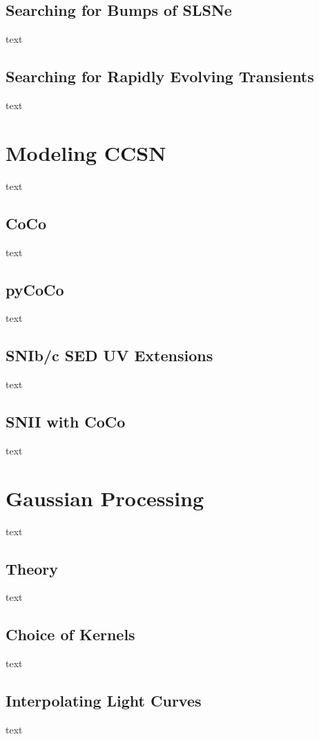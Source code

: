 \subsection{Searching for Bumps of SLSNe}
text
\subsection{Searching for Rapidly Evolving Transients}
text

\section{Modeling CCSN}
text
\subsection{CoCo}
text
\subsection{pyCoCo}
text
\subsection{SNIb/c SED UV Extensions}
text
\subsection{SNII with CoCo}
text

\section{Gaussian Processing}
text
\subsection{Theory}
text
\subsection{Choice of Kernels}
text
\subsection{Interpolating Light Curves}
text
